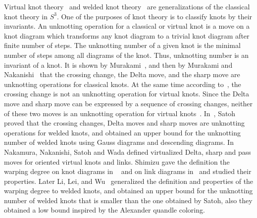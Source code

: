 \documentclass[11pt]{amsart}
\theoremstyle{noparens}
\numberwithin{equation}{section}
\numberwithin{equation}{section}
\begin{document}
Virtual knot theory~\citep{kauffman1999virtual} and welded knot theory~\citep{rourke2007welded,Fenn1997} are generalizations of the classical knot theory in $S^3$.
One of the purposes of knot theory is to classify knots by their invariants. An unknotting operation for a classical or virtual knot is a move on a knot diagram which transforms any knot diagram to a trivial knot diagram after finite number of steps. The unknotting number of a given knot is the minimal number of steps among all diagrams of the knot. Thus, unknotting number is an invariant of a knot.
It is shown by Murakami~\citep{Murakami1985}, and then by Murakami and Nakanishi~\citep{MurakamiNakanishi1989} that the crossing change, the Delta move, and the sharp move are unknotting operations for classical knots. At the same time according to~\citep{FennTuraev2007,Kadokami2006}, the crossing change is not an unknotting operation for virtual knots. Since the Delta move and sharp move can be expressed by a sequence of crossing changes, neither of these two moves is an unknotting operation for virtual knots~\citep{SatohTaniguchi2014}.
In~\citep{satoh2018crossing}, Satoh proved that the crossing changes, Delta moves and sharp moves are unknotting operations for welded knots, and obtained an upper bound for the unknotting number of welded knots using Gauss diagrams and descending diagrams. In~\citep{NNSW2025} Nakamura, Nakanishi, Satoh and Wada defined virtualized Delta, sharp and pass moves for oriented virtual knots and links. Shimizu gave the definition  the warping degree on knot diagrams in ~\citep{shimizu2010warping} and on link diagrams in~\citep{shimizu2011warping} and studied their properties. Later Li, Lei, and Wu~\citep{li2017unknotting} generalized the definition and properties of the warping degree to welded knots, and obtained an upper bound for the unknotting number of welded knots that is smaller than the one obtained by Satoh, also they obtained a low bound inspired by the Alexander quandle coloring. 
\end{document}
